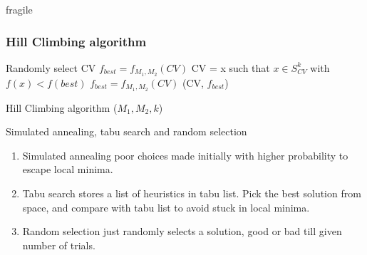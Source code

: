 \documentclass{beamer}
\begin{document}
\begin{frame}{fragile}
\frametitle{Hill Climbing algorithm \footnotemark}
\begin{algorithm}[H]
  \begin{algorithmic}[1]
    \State Randomly select CV
    \State $f_{best} = f_{M_{1}, M_{2}}(CV)$
    \State CV = x such that $x \in S^{k}_{CV}$ with $f(x) < f(best)$
    \State $f_{best} = f_{M_{1}, M_{2}}(CV)$
    \EndWhile
    \State \Return (CV, $f_{best}$)
  \end{algorithmic}
  \caption{Hill Climbing algorithm ($M_{1}, M_{2}, k$)}
\end{algorithm}
\end{frame}

\begin{frame}{Simulated annealing, tabu search and random selection}
\begin{enumerate}
\item Simulated annealing poor choices made initially with higher probability to escape local
minima.
\item Tabu search stores a list of heuristics in tabu list. Pick the best solution from space,
and compare with tabu list to avoid stuck in local minima.
\item Random selection just randomly selects a solution, good or bad till given number of trials.
\end{enumerate}
\end{frame}

\end{document}

